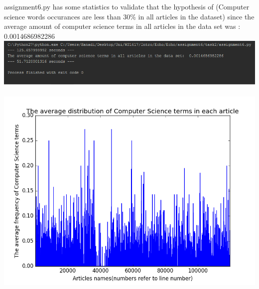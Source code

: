 \documentclass{WeSTassignment}
\begin{document}
assignment6.py has some statistics to validate that the hypothesis of (Computer science words occurances are less than 30\% in all articles in the dataset) since the average amount of computer science terms in all articles in the data set was : 0.0014686982286 \\
\includegraphics[width=1\textwidth]{output.png} \\ \\
\includegraphics[width=1\textwidth]{figure_1.png} \\






\makefooter
\end{document}
